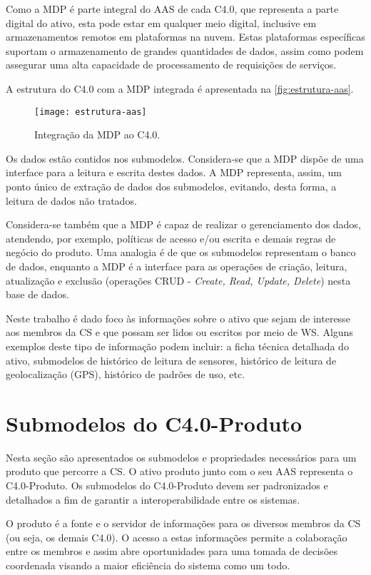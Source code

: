 Como a MDP é parte integral do AAS de cada C4.0, que representa a parte digital do ativo, esta pode estar em qualquer meio digital, inclusive em armazenamentos remotos em plataformas na nuvem. Estas plataformas específicas suportam o armazenamento de grandes quantidades de dados, assim como podem assegurar uma alta capacidade de processamento de requisições de serviços.

A estrutura do C4.0 com a MDP integrada é apresentada na \autoref{fig:estrutura-aas}.

\begin{figure}[htb]
	\centering
	\texttt{[image: estrutura-aas]}
	\caption{Integração da MDP ao C4.0.}
	\label{fig:estrutura-aas}
\end{figure}

Os dados estão contidos nos submodelos. Considera-se que a MDP dispõe de uma interface para a leitura e escrita destes dados. A MDP representa, assim, um ponto único de extração de dados dos submodelos, evitando, desta forma, a leitura de dados não tratados.

Considera-se também que a MDP é capaz de realizar o gerenciamento dos dados, atendendo, por exemplo, políticas de acesso e/ou escrita e demais regras de negócio do produto. Uma analogia é de que os submodelos representam o banco de dados, enquanto a MDP é a interface para as operações de criação, leitura, atualização e exclusão (operações CRUD - \textit{Create, Read, Update, Delete}) nesta base de dados.

Neste trabalho é dado foco às informações sobre o ativo que sejam de interesse aos membros da CS e que possam ser lidos ou escritos por meio de WS. Alguns exemplos deste tipo de informação podem incluir: a ficha técnica detalhada do ativo, submodelos de histórico de leitura de sensores, histórico de leitura de geolocalização (GPS), histórico de padrões de uso, etc.

\section{Submodelos do C4.0-Produto}
\label{sec:submodelos-produto}

Nesta seção são apresentados os submodelos e propriedades necessários para um produto que percorre a CS. O ativo produto junto com o seu AAS representa o C4.0-Produto. Os submodelos do C4.0-Produto devem ser padronizados e detalhados a fim de garantir a interoperabilidade entre os sistemas.

O produto é a fonte e o servidor de informações para os diversos membros da CS (ou seja, os demais C4.0). O acesso a estas informações permite a colaboração entre os membros e assim abre oportunidades para uma tomada de decisões coordenada visando a maior eficiência do sistema como um todo.

